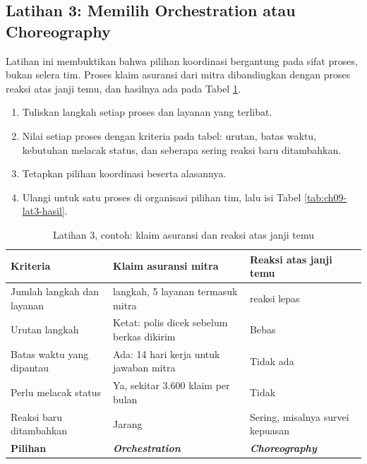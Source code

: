 \subsection*{Latihan 3: Memilih Orchestration atau Choreography}

Latihan ini membuktikan bahwa pilihan koordinasi bergantung pada sifat proses, bukan selera tim.
Proses klaim asuransi dari mitra dibandingkan dengan proses reaksi atas janji temu, dan hasilnya
ada pada Tabel \ref{tab:ch09-lat3-contoh}.

\begin{enumerate}
  \item Tuliskan langkah setiap proses dan layanan yang terlibat.
  \item Nilai setiap proses dengan kriteria pada tabel: urutan, batas waktu, kebutuhan melacak
        status, dan seberapa sering reaksi baru ditambahkan.
  \item Tetapkan pilihan koordinasi beserta alasannya.
  \item Ulangi untuk satu proses di organisasi pilihan tim, lalu isi Tabel
        \ref{tab:ch09-lat3-hasil}.
\end{enumerate}

\begin{table}[!htb]
  \centering
  \caption{Latihan 3, contoh: klaim asuransi dan reaksi atas janji temu}
  \label{tab:ch09-lat3-contoh}
  \footnotesize
  \begin{tabularx}{\textwidth}{>{\raggedright\arraybackslash}p{3.0cm} >{\raggedright\arraybackslash}X >{\raggedright\arraybackslash}X}
    \hline
    \textbf{Kriteria} & \textbf{Klaim asuransi mitra} & \textbf{Reaksi atas janji temu} \\
      \hline
    Jumlah langkah dan layanan & 4 langkah, 5 layanan termasuk mitra & 3 reaksi lepas \\ \hline
    Urutan langkah & Ketat: polis dicek sebelum berkas dikirim & Bebas \\ \hline
    Batas waktu yang dipantau & Ada: 14 hari kerja untuk jawaban mitra & Tidak ada \\ \hline
    Perlu melacak status & Ya, sekitar 3.600 klaim per bulan & Tidak \\ \hline
    Reaksi baru ditambahkan & Jarang & Sering, misalnya survei kepuasan \\ \hline
    \textbf{Pilihan} & \textbf{\textit{Orchestration}} & \textbf{\textit{Choreography}} \\ \hline
  \end{tabularx}
\end{table}

